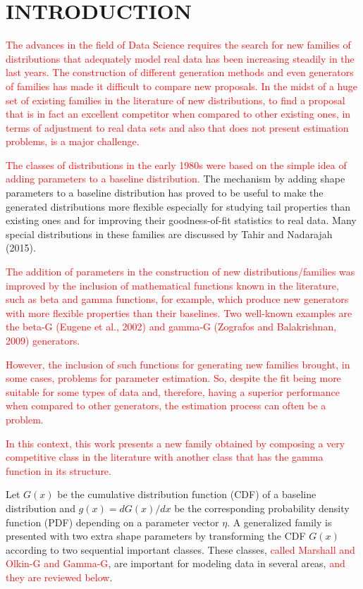 \documentclass[twoside,leqno,11pt]{article}
\begin{document}
\section{INTRODUCTION}

\textcolor{red}{The advances in the field of Data Science requires the search for new fa\-milies of distributions that adequately model real data has been increasing steadily in the last years.  The construction of different generation methods and even generators of families has made it difficult to compare new proposals. In the midst of a huge set of existing families in the literature of new distributions, to find a proposal that is in fact an excellent competitor when compared to other existing ones, in terms of adjustment to real data sets and also that does not present estimation problems, is a major challenge.}

\textcolor{red}{The classes of distributions in the early 1980s were based on the simple idea of adding parameters to a baseline distribution.} The mechanism by adding shape parameters to a baseline distribution has proved to be useful to make the 
generated distributions more flexible especially for studying 
tail properties than existing ones and for improving their goodness-of-fit statistics to real data. Many special 
distributions in these families are discussed by Tahir and Nadarajah (2015).

\textcolor{red}{The addition of parameters in the construction of new distributions/families was improved by the inclusion of mathematical functions known in the literature, such as beta and gamma functions, for example, which produce new generators 
with more flexible properties than their baselines. 
Two well-known examples are the beta-G (Eugene et al., 2002) 
and gamma-G (Zografos and Balakrishnan, 2009) generators.}

\textcolor{red}{However, the inclusion of such functions for generating new families brought, in some cases, problems for parameter estimation. So, despite the fit being more suitable for some types of data and, therefore, having a superior performance when compared to other generators, the estimation process can 
often be a problem.}

\textcolor{red}{In this context, this work presents a new family obtained by composing a very competitive class in the literature with another class that has the gamma function in its structure.} 

Let $G(x)$ be the cumulative distribution function (CDF) of a
baseline distribution and $g(x)=dG(x)/dx$ be the corresponding  probability density function (PDF) depending on a
parameter vector $\eta$. A generalized family is presented
with two extra shape parameters by transforming the CDF $G(x)$
according to two sequential important classes. 
These classes, \textcolor{red}{called Marshall and Olkin-G
and Gamma-G}, are important for modeling data in several areas,  \textcolor{red}{and they are reviewed below}. 
\end{document}
